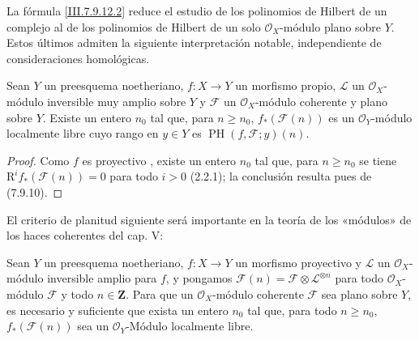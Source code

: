 La fórmula \eqref{III.7.9.12.2} reduce el estudio de los
polinomios de Hilbert de un complejo al de los polinomios de
Hilbert de un solo $\mathscr O_X$-módulo plano sobre $Y$.
Estos últimos admiten la siguiente interpretación notable,
independiente de consideraciones homológicas.

\begin{corollary}[7.9.13]
\label{III.7.9.13}
\label{III.7.9.13.fr}
Sean $Y$ un preesquema noetheriano, $f:X\to Y$ un morfismo propio,
$\mathscr L$ un $\mathscr O_X$-módulo inversible muy amplio sobre
$Y$ y $\mathscr F$ un $\mathscr O_X$-módulo coherente y plano
sobre $Y$. Existe un entero $n_0$ tal que, para $n\geq n_0$,
$f_*(\mathscr F(n))$ es un $\mathscr O_Y$-módulo localmente libre
cuyo rango en $y\in Y$ es
$\operatorname{PH}(f,\mathscr F;y)(n)$.
\end{corollary}

\begin{proof}
Como $f$ es proyectivo , existe un entero $n_0$
tal que, para $n\geq n_0$
se tiene $\mathrm R^if_*(\mathscr F(n))=0$ para todo $i>0$ (2.2.1); la conclusión
resulta pues de (7.9.10).
\end{proof}

El criterio de planitud siguiente será importante en la teoría de los «módulos»
de los haces coherentes del cap. V:

\begin{proposition}[7.9.14]
\label{III.7.9.14}
\label{III.7.9.14.fr}
Sean $Y$ un preesquema noetheriano, $f:X\to Y$ un morfismo
proyectivo y $\mathscr L$ un $\mathscr O_X$-módulo inversible
amplio para $f$, y pongamos
$\mathscr F(n)=\mathscr F\otimes\mathscr L^{\otimes n}$ para todo
$\mathscr O_X$-módulo $\mathscr F$ y
todo $n\in\mathbf Z$. Para que un
$\mathscr O_X$-módulo coherente $\mathscr F$ sea plano
sobre $Y$, es necesario y suficiente que exista un entero $n_0$
tal que, para todo $n\geq n_0$, $f_*(\mathscr F(n))$ sea un
$\mathscr O_Y$-Módulo localmente libre.
\end{proposition}

